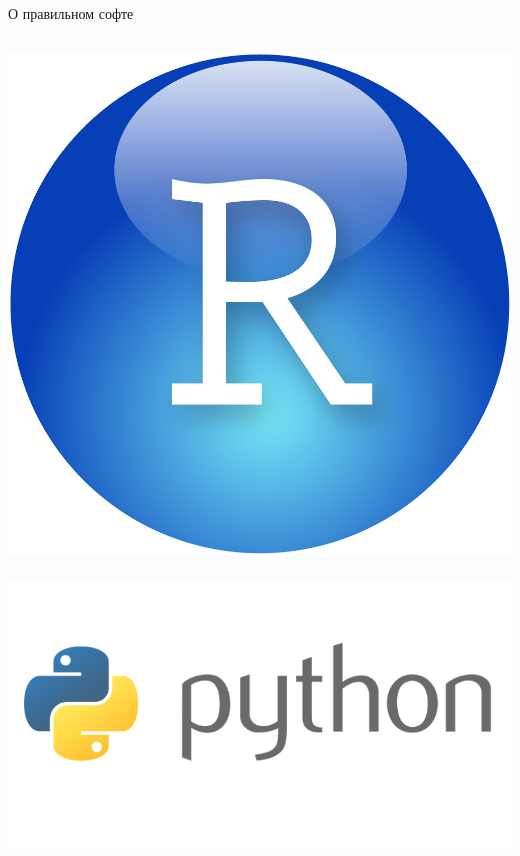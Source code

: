\documentclass[newPxFont]{beamer}
\begin{document}
\begin{frame}{О правильном софте}
\begin{columns}
\begin{column}{.48\linewidth}
\includegraphics[width=0.5\linewidth]{RStudio-Ball.png}\\
\mbox{ } \\
\includegraphics[width=0.9\linewidth]{Python-logo.png}\\
\end{column}



\end{columns}
\end{frame}
\end{document}
